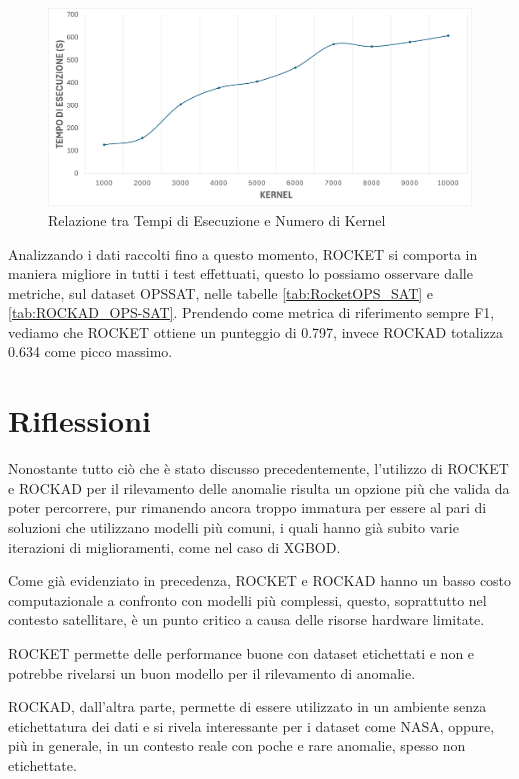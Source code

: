\begin{figure}[!ht]
    \centering
    \includegraphics[width=0.9\linewidth]{images//Capitolo7/GraficoTempoEsecuzione_ROCKAD.png}
    \caption{Relazione tra Tempi di Esecuzione e Numero di Kernel}
    \label{fig:grafico_tempo_ROCKAD}
\end{figure}

Analizzando i dati raccolti fino a questo momento, ROCKET si comporta in maniera migliore in tutti i test effettuati, questo lo possiamo osservare dalle metriche, sul dataset OPS\textunderscore SAT, nelle tabelle \ref{tab:RocketOPS_SAT} e \ref{tab:ROCKAD_OPS-SAT}.
Prendendo come metrica di riferimento sempre F1, vediamo che ROCKET ottiene un punteggio di 0.797, invece ROCKAD totalizza 0.634 come picco massimo.

\section{Riflessioni}
Nonostante tutto ciò che è stato discusso precedentemente, l'utilizzo di ROCKET e ROCKAD per il rilevamento delle anomalie risulta un opzione più che valida da poter percorrere, pur rimanendo ancora troppo immatura per essere al pari di soluzioni che utilizzano modelli più comuni, i quali hanno già subito varie iterazioni di miglioramenti, come nel caso di XGBOD.

Come già evidenziato in precedenza, ROCKET e ROCKAD hanno un basso costo computazionale a confronto con modelli più complessi, questo, soprattutto nel contesto satellitare, è un punto critico a causa delle risorse hardware limitate.

ROCKET permette delle performance buone con dataset etichettati e non e potrebbe rivelarsi un buon modello per il rilevamento di anomalie.

ROCKAD, dall'altra parte, permette di essere utilizzato in un ambiente senza etichettatura dei dati e si rivela interessante per i dataset come NASA, oppure, più in generale, in un contesto reale con poche e rare anomalie, spesso non etichettate.

